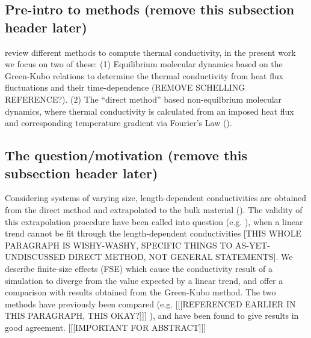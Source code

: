 \documentclass[%
preprint,                                  %
nofootinbib,
 amsmath,amssymb,
 aps,
]{revtex4-1}
\begin{document}

\subsection{\label{sec:intro.pre}Pre-intro to methods (remove this subsection header later)}

\citet{Stackhouse2010} review different methods to compute thermal conductivity, in the present work we focus on two of these:
(1) Equilibrium molecular dynamics based on the Green-Kubo relations to determine the thermal conductivity from heat flux fluctuations and their time-dependence (\citet{Green1954,Kubo1957,Kubo1966,Schelling2002}REMOVE SCHELLING REFERENCE?). 
(2) The ``direct method'' based non-equilbrium molecular dynamics, where thermal conductivity is calculated from an imposed heat flux and corresponding temperature gradient via Fourier's Law (\citet{Muller-Plathe1997,Nieto-Draghi2013}).


\subsection{\label{sec:intro.question}The question/motivation (remove this subsection header later)}

Considering systems of varying size, length-dependent conductivities are obtained from the direct method and extrapolated to the bulk material (\citet{Schelling2002}). The validity of this extrapolation procedure have been called into question (e.g. \citet{Sellan2010}), when a linear trend cannot be fit through the length-dependent conductivities [THIS WHOLE PARAGRAPH IS WISHY-WASHY, SPECIFIC THINGS TO AS-YET-UNDISCUSSED DIRECT METHOD, NOT GENERAL STATEMENTS]. We describe finite-size effects (FSE) which cause the conductivity result of a simulation to diverge from the value expected by a linear trend, and offer a comparison with results obtained from the Green-Kubo method. The two methods have previously been compared (e.g. \citet{Schelling2002} [[[REFERENCED EARLIER IN THIS PARAGRAPH, THIS OKAY?]]] ), and have been found to give results in good agreement. [[[IMPORTANT FOR ABSTRACT]]]
\end{document}
